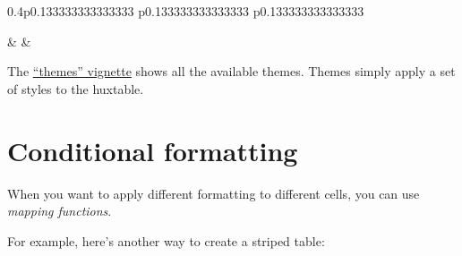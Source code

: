 \documentclass[]{article}
\newenvironment{Shaded}{\begin{snugshade}}{\end{snugshade}}
\newcommand{\KeywordTok}[1]{\textcolor[rgb]{0.13,0.29,0.53}{\textbf{#1}}}
\newcommand{\NormalTok}[1]{#1}
\newcommand{\OperatorTok}[1]{\textcolor[rgb]{0.81,0.36,0.00}{\textbf{#1}}}
\newcommand{\StringTok}[1]{\textcolor[rgb]{0.31,0.60,0.02}{#1}}
\begin{document}
\begin{table}[ht]
\begin{centerbox}
\begin{threeparttable}
\begin{tabularx}{0.4\textwidth}{p{} p{} p{}}

 &
 &
 \tabularnewline[-0.5pt]


\end{tabularx}
\end{threeparttable}\par\end{centerbox}

\end{table}
 

\FloatBarrier

The \href{themes.html}{``themes'' vignette} shows all the available
themes. Themes simply apply a set of styles to the huxtable.

\hypertarget{conditional-formatting}{%
\section{Conditional formatting}\label{conditional-formatting}}

When you want to apply different formatting to different cells, you can
use \emph{mapping functions}.

For example, here's another way to create a striped table:

\begin{Shaded}
\end{Shaded}

 
  \providecommand{\huxb}[2]{\arrayrulecolor[RGB]{#1}\global\arrayrulewidth=#2pt}
  \providecommand{\huxvb}[2]{\color[RGB]{#1}\vrule width #2pt}
  \providecommand{\huxtpad}[1]{\rule{0pt}{#1}}
  \providecommand{\huxbpad}[1]{\rule[-#1]{0pt}{#1}}
\end{document}
